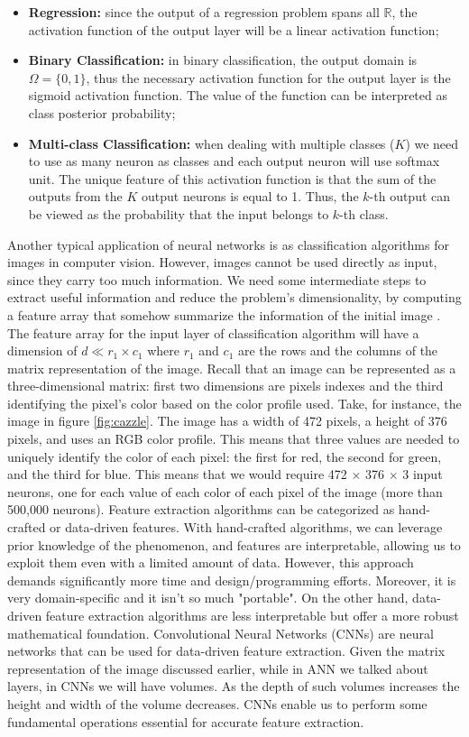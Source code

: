 \begin{itemize}
    \item \textbf{Regression:} since the output of a regression problem spans all $\mathbb{R}$, the activation function of the output layer will be a linear activation function;
    \item \textbf{Binary Classification:} in binary classification, the output domain is $\Omega=\{0, 1\}$, thus the necessary activation function for the output layer is the sigmoid activation function. The value of the function can be interpreted as class posterior probability;
    \item \textbf{Multi-class Classification:} when dealing with multiple classes ($K$) we need to use as many neuron as classes and each output neuron will use softmax unit. The unique feature of this activation function is that the sum of the outputs from the $K$ output neurons is equal to 1. Thus, the $k$-th output can be viewed as the probability that the input belongs to $k$-th class.
\end{itemize}
Another typical application of neural networks is as classification algorithms for images in computer vision. However, images cannot be used directly as input, since they carry too much information. We need some intermediate steps to extract useful information and reduce the problem's dimensionality, by computing a feature array that somehow summarize the information of the initial image \cite{giacomo_boracchi_convolutional_2021}. The feature array for the input layer of classification algorithm will have a dimension of $d\ll r_1 \times c_1$ where $r_1$ and $c_1$ are the rows and the columns of the matrix representation of the image. Recall that an image can be represented as a three-dimensional matrix: first two dimensions are pixels indexes and the third identifying the pixel's color based on the color profile used. Take, for instance, the image in figure \ref{fig:cazzle}. The image has a width of 472 pixels, a height of 376 pixels, and uses an RGB color profile. This means that three values are needed to uniquely identify the color of each pixel: the first for red, the second for green, and the third for blue. This means that we would require 472 $\times$ 376 $\times$ 3 input neurons, one for each value of each color of each pixel of the image (more than 500,000 neurons). Feature extraction algorithms can be categorized as hand-crafted or data-driven features. With hand-crafted algorithms, we can leverage prior knowledge of the phenomenon, and features are interpretable, allowing us to exploit them even with a limited amount of data. However, this approach demands significantly more time and design/programming efforts. Moreover, it is very domain-specific and it isn't so much "portable". On the other hand, data-driven feature extraction algorithms are less interpretable but offer a more robust mathematical foundation. Convolutional Neural Networks (CNNs) are neural networks that can be used for data-driven feature extraction. Given the matrix representation of the image discussed earlier, while in ANN we talked about layers, in CNNs we will have volumes. As the depth of such volumes increases the height and width of the volume decreases. CNNs enable us to perform some fundamental operations essential for accurate feature extraction.
